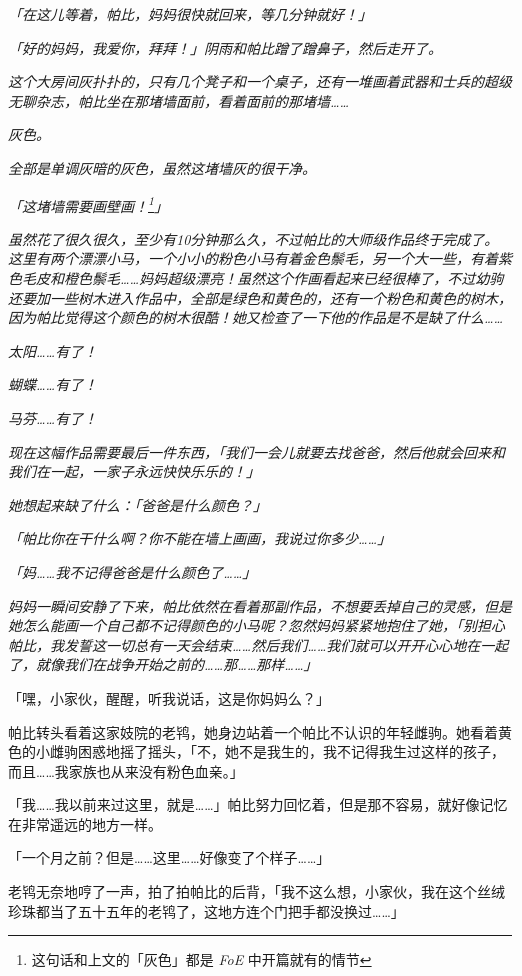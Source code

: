 \emph{「在这儿等着，帕比，妈妈很快就回来，等几分钟就好！」}

\emph{「好的妈妈，我爱你，拜拜！」阴雨和帕比蹭了蹭鼻子，然后走开了。}

\emph{这个大房间灰扑扑的，只有几个凳子和一个桌子，还有一堆画着武器和士兵的超级无聊杂志，帕比坐在那堵墙面前，看着面前的那堵墙……}

\emph{灰色。}

\emph{全部是单调灰暗的灰色，虽然这堵墙灰的很干净。}

\emph{「这堵墙需要画壁画！\footnote{这句话和上文的「灰色」都是 \emph{FoE} 中开篇就有的情节}」}

\emph{虽然花了很久很久，至少有10分钟那么久，不过帕比的大师级作品终于完成了。这里有两个漂漂小马，一个小小的粉色小马有着金色鬃毛，另一个大一些，有着紫色毛皮和橙色鬃毛……妈妈超级漂亮！虽然这个作画看起来已经很棒了，不过幼驹还要加一些树木进入作品中，全部是绿色和黄色的，还有一个粉色和黄色的树木，因为帕比觉得这个颜色的树木很酷！她又检查了一下他的作品是不是缺了什么……}

\emph{太阳……有了！}

\emph{蝴蝶……有了！}

\emph{马芬……有了！}

\emph{现在这幅作品需要最后一件东西，「我们一会儿就要去找爸爸，然后他就会回来和我们在一起，一家子永远快快乐乐的！」}

\emph{她想起来缺了什么：「爸爸是什么颜色？」}

\emph{「帕比你在干什么啊？你不能在墙上画画，我说过你多少……」}

\emph{「妈……我不记得爸爸是什么颜色了……」}

\emph{妈妈一瞬间安静了下来，帕比依然在看着那副作品，不想要丢掉自己的灵感，但是她怎么能画一个自己都不记得颜色的小马呢？忽然妈妈紧紧地抱住了她，「别担心帕比，我发誓这一切总有一天会结束……然后我们……我们就可以开开心心地在一起了，就像我们在战争开始之前的……那……那样……」}

「嘿，小家伙，醒醒，听我说话，这是你妈妈么？」

帕比转头看着这家妓院的老鸨，她身边站着一个帕比不认识的年轻雌驹。她看着黄色的小雌驹困惑地摇了摇头，「不，她不是我生的，我不记得我生过这样的孩子，而且……我家族也从来没有粉色血亲。」

「我……我以前来过这里，就是……」帕比努力回忆着，但是那不容易，就好像记忆在非常遥远的地方一样。

「一个月之前？但是……这里……好像变了个样子……」

老鸨无奈地哼了一声，拍了拍帕比的后背，「我不这么想，小家伙，我在这个丝绒珍珠都当了五十五年的老鸨了，这地方连个门把手都没换过……」

